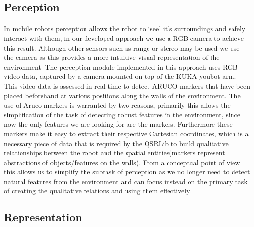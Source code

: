 \subsection{Perception}
\paragraph{}In mobile robots perception allows the robot to `see' it's surroundings and safely interact with them, in our developed approach we use a RGB camera to achieve this result. Although other sensors such as range or stereo may be used we use the camera as this provides a more intuitive visual representation of the environment. The perception module implemented in this approach uses RGB video data, captured by a camera mounted on top of the KUKA youbot arm. This video data is assessed in real time to detect ARUCO markers that have been placed beforehand at various positions along the walls of the environment. The use of Aruco markers is warranted by two reasons, primarily this allows the simplification of the task of detecting robust features in the environment, since now the only features we are looking for are the markers. Furthermore these markers make it easy to extract their respective Cartesian coordinates, which is a necessary piece of data that is required by the QSRLib to build qualitative relationships between the robot and the spatial entities(markers represent abstractions of objects/features on the walls). From a conceptual point of view this allows us to simplify the subtask of perception as we no longer need to detect natural features from the environment and can focus instead on the primary task of creating the qualitative relations and using them effectively.

\subsection{Representation}
